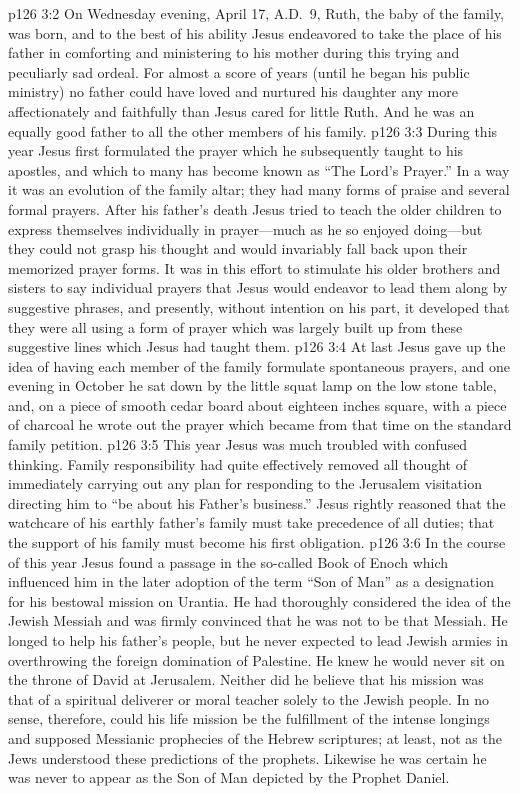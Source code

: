 \vs p126 3:2 On Wednesday evening, April 17, A.D.~9, Ruth, the baby of the family, was born, and to the best of his ability Jesus endeavored to take the place of his father in comforting and ministering to his mother during this trying and peculiarly sad ordeal. For almost a score of years (until he began his public ministry) no father could have loved and nurtured his daughter any more affectionately and faithfully than Jesus cared for little Ruth. And he was an equally good father to all the other members of his family.
\pc \vs p126 3:3 During this year Jesus first formulated the prayer which he subsequently taught to his apostles, and which to many has become known as “The Lord’s Prayer.” In a way it was an evolution of the family altar; they had many forms of praise and several formal prayers. After his father’s death Jesus tried to teach the older children to express themselves individually in prayer---much as he so enjoyed doing---but they could not grasp his thought and would invariably fall back upon their memorized prayer forms. It was in this effort to stimulate his older brothers and sisters to say individual prayers that Jesus would endeavor to lead them along by suggestive phrases, and presently, without intention on his part, it developed that they were all using a form of prayer which was largely built up from these suggestive lines which Jesus had taught them.
\vs p126 3:4 At last Jesus gave up the idea of having each member of the family formulate spontaneous prayers, and one evening in October he sat down by the little squat lamp on the low stone table, and, on a piece of smooth cedar board about eighteen inches square, with a piece of charcoal he wrote out the prayer which became from that time on the standard family petition.
\pc \vs p126 3:5 This year Jesus was much troubled with confused thinking. Family responsibility had quite effectively removed all thought of immediately carrying out any plan for responding to the Jerusalem visitation directing him to “be about his Father’s business.” Jesus rightly reasoned that the watchcare of his earthly father’s family must take precedence of all duties; that the support of his family must become his first obligation.
\pc \vs p126 3:6 In the course of this year Jesus found a passage in the so\hyp{}called Book of Enoch which influenced him in the later adoption of the term “Son of Man” as a designation for his bestowal mission on Urantia. He had thoroughly considered the idea of the Jewish Messiah and was firmly convinced that he was not to be that Messiah. He longed to help his father’s people, but he never expected to lead Jewish armies in overthrowing the foreign domination of Palestine. He knew he would never sit on the throne of David at Jerusalem. Neither did he believe that his mission was that of a spiritual deliverer or moral teacher solely to the Jewish people. In no sense, therefore, could his life mission be the fulfillment of the intense longings and supposed Messianic prophecies of the Hebrew scriptures; at least, not as the Jews understood these predictions of the prophets. Likewise he was certain he was never to appear as the Son of Man depicted by the Prophet Daniel.
